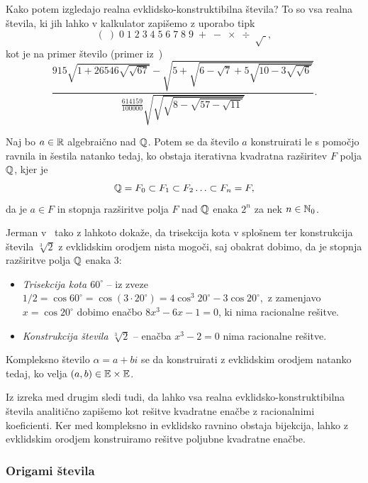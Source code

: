 Kako potem izgledajo realna evklidsko-konstruktibilna števila? To so vsa realna števila, ki jih lahko v kalkulator zapišemo z uporabo tipk
$$ (\;)\;0\;1\;2\;3\;4\;5\;6\;7\;8\;9\;+\;-\;\times\;\div\;\sqrt{\;},$$
kot je na primer število (primer iz~\cite[str.\ 37]{geometricconstructions})
$$ \frac{
    915 \sqrt{1 + 26546 \sqrt{\sqrt{67}}} -
    \sqrt{5 + \sqrt{6 - \sqrt{7} + 5\sqrt{10 - 3\sqrt{\sqrt{6}}}}}
}{
    \frac{614159}{100000} \sqrt{\sqrt{\sqrt{8 - \sqrt{57 - \sqrt{11}}}}}
}.
$$

\begin{izrek}
    \label{izr:evkl_konstr}
    Naj bo $a \in \mathbb R$ algebraično nad $\mathbb Q$. Potem se da število $a$ konstruirati le s pomočjo ravnila in šestila natanko tedaj, ko obstaja iterativna kvadratna razširitev $F$ polja $\mathbb Q$, kjer je
    $$ \mathbb Q = F_0 \subset F_1 \subset F_2 \ldots \subset F_n = F,$$
    da je $a \in F$ in stopnja razširitve polja $F$ nad $\mathbb Q$ enaka $2^n$ za nek $n \in \mathbb N_0$.
\end{izrek}

Jerman v~\cite[str.\ 77--78]{jerman1998} tako z lahkoto dokaže, da trisekcija kota v splošnem ter konstrukcija števila $ \sqrt[3]{2} $ z evklidskim orodjem nista mogoči, saj obakrat dobimo, da je stopnja razširitve polja $\mathbb Q$ enaka $3$:
\begin{itemize}
    \label{dokaz_trisekcija}
    \item \emph{Trisekcija kota $60^\circ$} -- iz zveze $ 1/2 = \cos 60^\circ = \cos(3 \cdot 20^\circ) = 4 \cos^3 20^\circ - 3 \cos 20^\circ, $ z zamenjavo $x = \cos 20^\circ$ dobimo enačbo $8 x^3 - 6x - 1 = 0$, ki nima racionalne rešitve.
    \item \emph{Konstrukcija števila $\sqrt[3]{2}$} -- enačba $x^3 - 2 = 0$ nima racionalne rešitve.
\end{itemize}

\begin{posledica}
    Kompleksno število $\alpha = a + bi$ se da konstruirati z evklidskim orodjem natanko tedaj, ko velja $(a, b) \in \mathbb E \times \mathbb E$.
\end{posledica}

Iz izreka med drugim sledi tudi, da lahko vsa realna evklidsko-konstruktibilna števila analitično zapišemo kot rešitve kvadratne enačbe z racionalnimi koeficienti. Ker med kompleksno in evklidsko ravnino obstaja bijekcija, lahko z evklidskim orodjem konstruiramo rešitve poljubne kvadratne enačbe.

\subsubsection{Origami števila}
\label{origami_konstruktibilnost}

